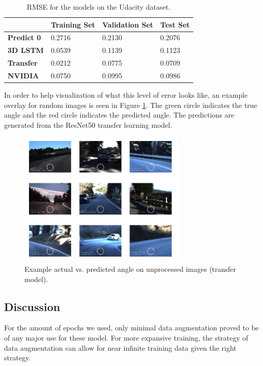 \documentclass[10pt,twocolumn,letterpaper]{article}
\begin{document}
\begin{table}[!htb]
	\centering
	\caption{RMSE for the models on the Udacity dataset.}
	\label{model_results}
	\begin{tabular}{|l|l|l|l|}
		\hline
		& \textbf{Training Set} & \textbf{Validation Set} & \textbf{Test Set} \\ \hline
		\textbf{Predict 0}      & 0.2716                & 0.2130                  & 0.2076            \\ \hline
		\textbf{3D LSTM}        & 0.0539                & 0.1139                  & 0.1123            \\ \hline
		\textbf{Transfer}       & 0.0212                & 0.0775                  & 0.0709            \\ \hline
		\textbf{NVIDIA}         & 0.0750                & 0.0995                  & 0.0986            \\ \hline
	\end{tabular}
\end{table}

In order to help visualization of what this level of error looks like, an example overlay for random images is seen in Figure \ref{angle_overlay}. The green circle indicates the true angle and the red circle indicates the predicted angle. The predictions are generated from the ResNet50 transfer learning model.

\begin{figure}[!htb]
	\includegraphics[width=8cm]{angle_overlay.JPG}
	\centering
	\caption{Example actual vs. predicted angle on unprocessed images (transfer model).}
	\label{angle_overlay}
\end{figure}

\subsection{Discussion}
For the amount of epochs we used, only minimal data augmentation proved to be of any major use for these model. For more expansive training, the strategy of data augmentation can allow for near infinite training data given the right strategy. 
\end{document}
